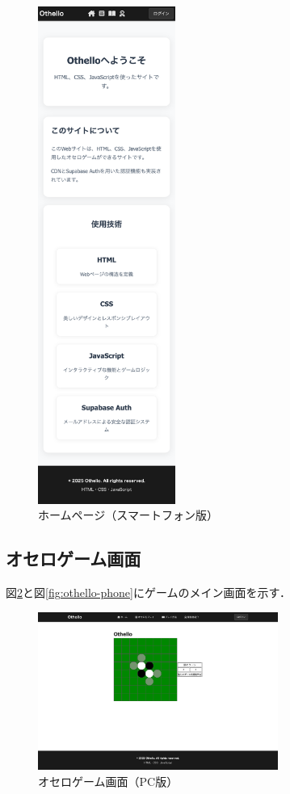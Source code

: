 \documentclass[10pt, a4paper]{jsarticle}
\begin{document}
\begin{figure}[H]
\centering
\includegraphics[width=0.4\textwidth]{img/index-phone.png}
\caption{ホームページ（スマートフォン版）}
\label{fig:index-phone}
\end{figure}

\subsection{オセロゲーム画面}
図\ref{fig:othello-pc}と図\ref{fig:othello-phone}にゲームのメイン画面を示す．

\begin{figure}[H]
\centering
\includegraphics[width=0.7\textwidth]{img/othello-pc.png}
\caption{オセロゲーム画面（PC版）}
\label{fig:othello-pc}
\end{figure}
\end{document}
